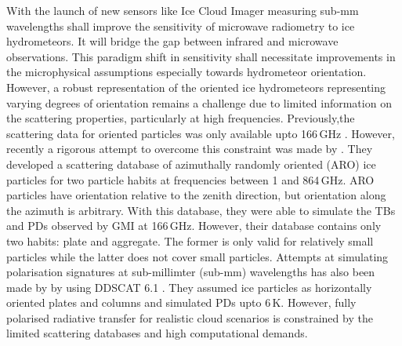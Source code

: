 \documentclass[amt, manuscript]{copernicus}
\begin{document}
With the launch of new sensors like Ice Cloud Imager \citep[ICI,][]{eriksson:towar:20} measuring sub-mm wavelengths shall improve the sensitivity of microwave radiometry to ice hydrometeors.
It will bridge the gap between infrared and microwave observations. This paradigm shift in sensitivity shall necessitate improvements in the microphysical assumptions especially towards hydrometeor orientation. However, a robust representation of the oriented ice hydrometeors representing varying degrees of orientation remains a challenge due to limited information on the scattering properties, particularly at high frequencies. Previously,the scattering data for oriented particles was only available upto 166\,GHz \citep{adams:thesc:12}. However, recently a rigorous attempt to overcome this constraint was made by \citet{brath:micro:20}. They developed a scattering database of azimuthally randomly oriented (ARO) ice particles for two particle habits at frequencies between 1 and 864\,GHz. ARO particles have orientation relative to the zenith direction, but orientation along the azimuth is arbitrary. With this database, they were able to simulate the TBs and PDs observed by GMI at 166\,GHz. However, their database contains only two habits: plate and aggregate. The former is only valid for relatively small particles while the latter does not cover small particles. Attempts at simulating polarisation signatures at sub-millimter (sub-mm) wavelengths has also been made by \citet{xie:polar:11} by using DDSCAT 6.1 \citep{draine:user:13}. They assumed ice particles as horizontally oriented plates and columns and simulated PDs upto 6\,K. However, fully polarised radiative transfer for realistic cloud scenarios is constrained by the limited scattering databases and high computational demands. 

\end{document}

